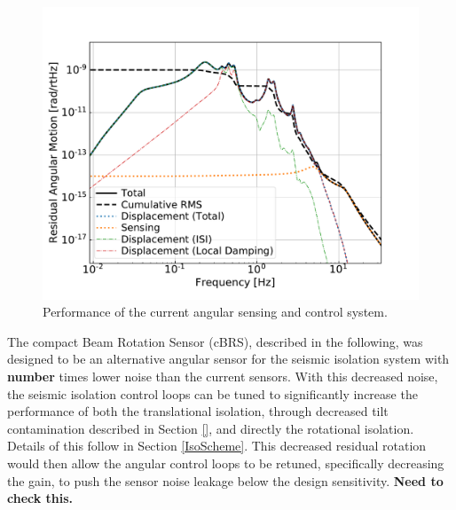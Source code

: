 \documentclass [12pt, proquest]{uwthesis}[2019]
\begin{document}
\begin{figure}
\begin{center}
\includegraphics[width=\textwidth]{cBRS_ASC_Without.pdf}
\caption{Performance of the current angular sensing and control system.}
\label{ascWithout}
\end{center}
\end{figure}


The compact Beam Rotation Sensor (cBRS), described in the following, was designed to be an alternative angular sensor for the seismic isolation system with \textbf{number} times lower noise than the current sensors. With this decreased noise, the seismic isolation control loops can be tuned to significantly increase the performance of both the translational isolation, through decreased tilt contamination described in Section \ref{}, and directly the rotational isolation. Details of this follow in Section \ref{IsoScheme}. This decreased residual rotation would then allow the angular control loops to be retuned, specifically decreasing the gain, to push the sensor noise leakage below the design sensitivity. \textbf{Need to check this.}
\end{document}
